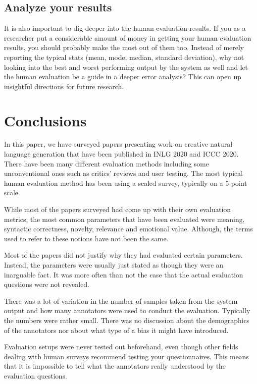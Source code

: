 \documentclass[11pt,a4paper]{article}
\begin{document}
\subsection{Analyze your results}

It is also important to dig deeper into the human evaluation results. If you as a researcher put a considerable amount of money in getting your human evaluation results, you should probably make the most out of them too. Instead of merely reporting the typical stats (mean, mode, median, standard deviation), why not looking into the best and worst performing output by the system as well and let the human evaluation be a guide in a deeper error analysis? This can open up insightful directions for future research. 

\section{Conclusions}

In this paper, we have surveyed papers presenting work on creative natural language generation that have been published in INLG 2020 and ICCC 2020. There have been many different evaluation methods including some unconventional ones such as critics' reviews and user testing. The most typical human evaluation method has been using a scaled survey, typically on a 5 point scale.

While most of the papers surveyed had come up with their own evaluation metrics, the most common parameters that have been evaluated were meaning, syntactic correctness, novelty, relevance and emotional value. Although, the terms used to refer to these notions have not been the same.

Most of the papers did not justify why they had evaluated certain parameters. Instead, the parameters were usually just stated as though they were an inarguable fact. It was more often than not the case that the actual evaluation questions were not revealed.

There was a lot of variation in the number of samples taken from the system output and how many annotators were used to conduct the evaluation. Typically the numbers were rather small. There was no discussion about the demographics of the annotators nor about what type of a bias it might have introduced.

Evaluation setups were never tested out beforehand, even though other fields dealing with human surveys recommend testing your questionnaires. This means that it is impossible to tell what the annotators really understood by the evaluation questions.
\end{document}
